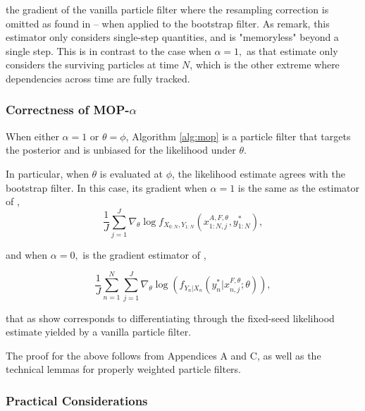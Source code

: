 \documentclass{article}
\begin{document}
the gradient of the vanilla particle filter where the resampling correction is omitted as found in \cite{blei2018vsmc} -- when applied to the bootstrap filter. As \cite{scibior2021dpf} remark, this estimator only considers single-step quantities, and is "memoryless" beyond a single step. This is in contrast to the case when $\alpha=1,$ as that estimate only considers the surviving particles at time $N$, which is the other extreme where dependencies across time are fully tracked. 



\subsubsection{Correctness of MOP-$\alpha$}

\begin{prop}
    \label{prop:mop-correctness}
    When either $\alpha=1$ or $\theta=\phi$, Algorithm \ref{alg:mop} is a particle filter that targets the posterior and is unbiased for the likelihood under $\theta$. 
    
    In particular, when $\theta$ is evaluated at $\phi$, the likelihood estimate agrees with the bootstrap filter. In this case, its gradient when $\alpha=1$ is the same as the estimator of \citet{doucet2011sf},
    \begin{equation}
        \frac{1}{J}\sum_{j=1}^J \nabla_\theta \log f_{X_{0:N}, Y_{1:N}}(x_{1:N,j}^{A, F,\theta}, y_{1:N}^*),
    \end{equation}

    and when $\alpha=0,$ is the gradient estimator of \cite{blei2018vsmc},

    \begin{equation}
        \frac{1}{J} \sum_{n=1}^N \sum_{j=1}^J \nabla_\theta \log\left(f_{Y_n|X_{n}}(y_n^*|x_{n,j}^{F, \theta}; \theta)\right),
    \end{equation}

    that as \cite{scibior2021dpf} show corresponds to differentiating through the fixed-seed likelihood estimate yielded by a vanilla particle filter.
\end{prop}

The proof for the above follows from Appendices A and C, as well as the technical lemmas for properly weighted particle filters. 


\subsubsection{Practical Considerations}
\end{document}
